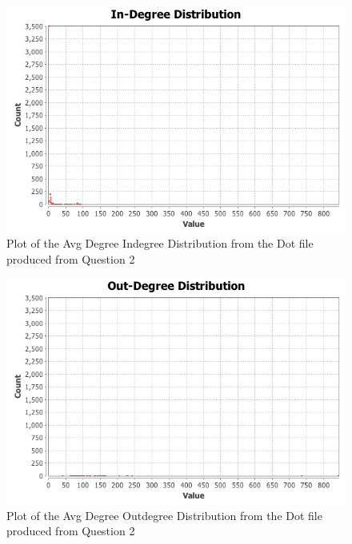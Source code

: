 \documentclass[letterpaper,11pt]{article}
\begin{document}
\begin{figure}[p]
\includegraphics[scale=0.5]{q3/Avg-Degree/indegree-distribution.png}
\caption{Plot of the Avg Degree Indegree Distribution from the Dot file produced from Question 2}
\label{fig:q3avgdegree-indegree-distribution}
\end{figure}

\begin{figure}[p]
\includegraphics[scale=0.5]{q3/Avg-Degree/outdegree-distribution.png}
\caption{Plot of the Avg Degree Outdegree Distribution from the Dot file produced from Question 2}
\label{fig:q3avgdegree-outdegree-distribution}
\end{figure}
\end{document}
